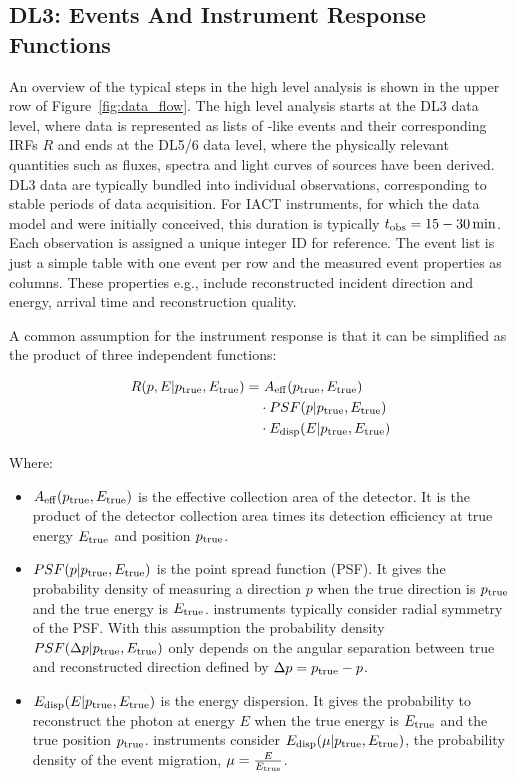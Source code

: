 \documentclass[longauth]{aa}
\begin{document}
\subsection{DL3: Events And Instrument Response Functions}
An overview of the typical steps in the high level analysis is shown in the upper
row of Figure~\ref{fig:data_flow}. The high level analysis starts at the DL3 
data level, where \gammaray data is represented as lists of \gammaray-like events and their
corresponding IRFs $R$ and ends at the DL5/6 data level, where the physically relevant 
quantities such as fluxes, spectra and light curves of sources have been derived. DL3 data are typically 
bundled into individual observations, corresponding to
stable periods of data acquisition. For IACT instruments, for which the \gadf
data model and \gammapy were initially conceived, this duration is typically 
$t_{\rm obs}=15 - 30\,{\rm min}$. Each observation is assigned a unique integer ID for reference.
The event list is just a simple table with one event per row and
the measured event properties as columns. These properties e.g., include reconstructed
incident direction and energy, arrival time and reconstruction quality.

A common assumption for the instrument response is that it can be simplified as the product 
of three independent functions:

\begin{equation}
	\begin{split}
   R(p, E|p_{\rm true}, E_{\rm true}) = &~A_{\rm eff}(p_{\rm true}, E_{\rm true}) \\
	& \cdot PSF(p|p_{\rm true}, E_{\rm true})\\
    & \cdot E_{\rm disp}(E|p_{\rm true}, E_{\rm true})
	\end{split}
\end{equation}

\noindent Where:
\begin{itemize}
\setlength\itemsep{1em}
\item $A_{\rm eff}(p_{\rm true}, E_{\rm true})$ is the effective collection area of the detector. It is the product
  of the detector collection area times its detection efficiency at true energy $E_{\rm true}$ and position $p_{\rm true}$.
\item $PSF(p|p_{\rm true}, E_{\rm true})$ is the point spread function (PSF). It gives the probability density of
  measuring a direction $p$ when the true direction is $p_{\rm true}$ and the true energy is $E_{\rm true}$.
  \gammaray instruments typically consider radial symmetry of the PSF. With this assumption the probability density 
  $PSF(\Delta p|p_{\rm true}, E_{\rm true})$ only depends on the angular separation between true
 and reconstructed direction defined by $\Delta p = p_{\rm true} - p$.  
\item $E_{\rm disp}(E|p_{\rm true}, E_{\rm true})$ is the energy dispersion. It gives the probability to
  reconstruct the photon at energy $E$ when the true energy is $E_{\rm true}$ and the true position $p_{\rm true}$.
  \gammaray instruments consider $E_{\rm disp}(\mu|p_{\rm true}, E_{\rm true})$, the probability density of the event
  migration, $\mu=\frac{E}{E_{\rm true}}$.
\end{itemize}
\end{document}

